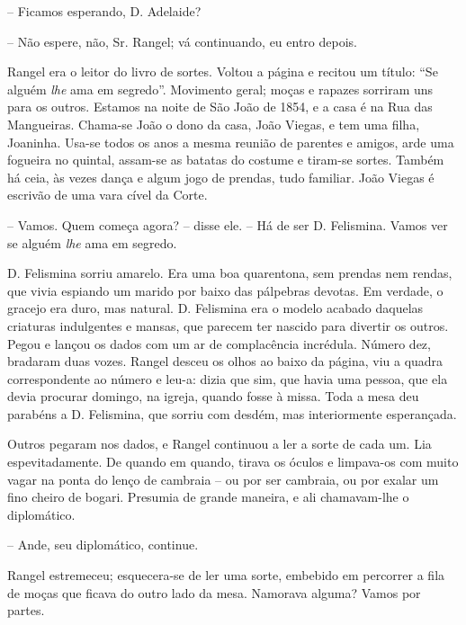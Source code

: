 -- Ficamos esperando, D. Adelaide?

-- Não espere, não, Sr. Rangel; vá continuando, eu entro depois.

Rangel era o leitor do livro de sortes. Voltou a página e recitou um
título: ``Se alguém \emph{lhe} ama em segredo''. Movimento geral; moças
e rapazes sorriram uns para os outros. Estamos na noite de São João de
1854, e a casa é na Rua das Mangueiras. Chama-se João o dono da casa,
João Viegas, e tem uma filha, Joaninha. Usa-se todos os anos a mesma
reunião de parentes e amigos, arde uma fogueira no quintal, assam-se as
batatas do costume e tiram-se sortes. Também há ceia, às vezes dança e
algum jogo de prendas, tudo familiar. João Viegas é escrivão de uma vara
cível da Corte.

-- Vamos. Quem começa agora? -- disse ele. -- Há de ser D. Felismina.
Vamos ver se alguém \emph{lhe} ama em segredo.

D. Felismina sorriu amarelo. Era uma boa quarentona, sem prendas nem
rendas, que vivia espiando um marido por baixo das pálpebras devotas. Em
verdade, o gracejo era duro, mas natural. D. Felismina era o modelo
acabado daquelas criaturas indulgentes e mansas, que parecem ter nascido
para divertir os outros. Pegou e lançou os dados com um ar de
complacência incrédula. Número dez, bradaram duas vozes. Rangel desceu
os olhos ao baixo da página, viu a quadra correspondente ao número e
leu-a: dizia que sim, que havia uma pessoa, que ela devia procurar
domingo, na igreja, quando fosse à missa. Toda a mesa deu parabéns a D.
Felismina, que sorriu com desdém, mas interiormente esperançada.

Outros pegaram nos dados, e Rangel continuou a ler a sorte de cada um.
Lia espevitadamente. De quando em quando, tirava os óculos e limpava-os
com muito vagar na ponta do lenço de cambraia -- ou por ser cambraia, ou
por exalar um fino cheiro de bogari. Presumia de grande maneira, e ali
chamavam-lhe o diplomático.

-- Ande, seu diplomático, continue.

Rangel estremeceu; esquecera-se de ler uma sorte, embebido em percorrer
a fila de moças que ficava do outro lado da mesa. Namorava alguma? Vamos
por partes.

